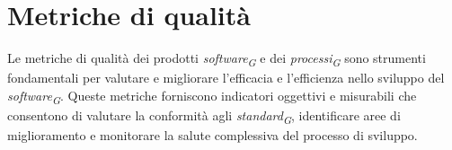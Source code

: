 \section{Metriche di qualità}
Le metriche di qualità dei prodotti \textit{software}\textsubscript{\textit{G}} e dei \textit{processi}\textsubscript{\textit{G}} sono strumenti fondamentali per valutare e migliorare l'efficacia e l'efficienza nello sviluppo del \textit{software}\textsubscript{\textit{G}}. Queste metriche forniscono indicatori oggettivi e misurabili che consentono di valutare la conformità agli \textit{standard}\textsubscript{\textit{G}}, identificare aree di miglioramento e monitorare la salute complessiva del processo di sviluppo.

\pagebreak



